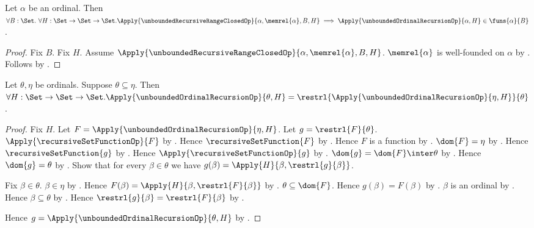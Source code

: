 \begin{theorem}\label{unbounded_ordinal_recursion_range}
    Let $\alpha$ be an ordinal.
    Then $\forall B:\Set.\ \forall H:\Set\to\Set\to\Set.
        \Apply{\unboundedRecursiveRangeClosedOp}
            {\alpha,\memrel{\alpha},B,H}
        \implies
        \Apply{\unboundedOrdinalRecursionOp}{\alpha,H}
            \in\funs{\alpha}{B}$.
\end{theorem}
\begin{proof}
    Fix $B$.
    Fix $H$.
    Assume $\Apply{\unboundedRecursiveRangeClosedOp}
        {\alpha,\memrel{\alpha},B,H}$.
    $\memrel{\alpha}$ is well-founded on $\alpha$ by
        .
    Follows by .
\end{proof}

\begin{theorem}\label{unbounded_ordinal_recursion_segment}
    Let $\theta,\eta$ be ordinals.
    Suppose $\theta\subseteq\eta$.
    Then $\forall H:\Set\to\Set\to\Set.
        \Apply{\unboundedOrdinalRecursionOp}{\theta,H}
        =\restrl{
            \Apply{\unboundedOrdinalRecursionOp}{\eta,H}}
            {\theta}$.
\end{theorem}
\begin{proof}
    Fix $H$.
    Let $F=\Apply{\unboundedOrdinalRecursionOp}{\eta,H}$.
    Let $g=\restrl{F}{\theta}$.
    $\Apply{\recursiveSetFunctionOp}{F}$ by
        .
    Hence $\recursiveSetFunction{F}$ by
        .
    Hence $F$ is a function by .
    $\dom{F}=\eta$ by .
    Hence $\recursiveSetFunction{g}$ by
        .
    Hence $\Apply{\recursiveSetFunctionOp}{g}$ by
        .
    $\dom{g}=\dom{F}\inter\theta$ by
        .
    Hence $\dom{g}=\theta$ by
        .
    Show that for every $\beta\in\theta$ we have
        $g(\beta)=\Apply{H}{\beta,\restrl{g}{\beta}}$.
    \begin{subproof}
        Fix $\beta\in\theta$.
        $\beta\in\eta$ by .
        Hence $F(\beta)=\Apply{H}{\beta,
            \restrl{F}{\beta}}$ by
            .
        $\theta\subseteq\dom{F}$.
        Hence $g(\beta)=F(\beta)$ by
            .
        $\beta$ is an ordinal by .
        Hence $\beta\subseteq\theta$ by
            .
        Hence $\restrl{g}{\beta}=\restrl{F}{\beta}$ by
            .
    \end{subproof}
    Hence $g=\Apply{\unboundedOrdinalRecursionOp}{\theta,H}$ by
        .
\end{proof}

